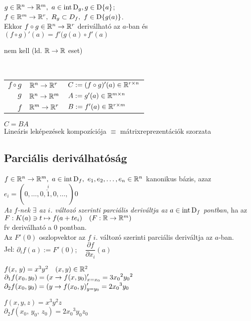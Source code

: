 \begin{te}
  $g\in\mathbb{R}^n\to\mathbb{R}^m,\ a\in\operatorname{int\,D}_g, g\in\operatorname{D}\{a\}$;\\ $f\in\mathbb{R}^m\to\mathbb{R}^r,\ R_g\subset D_f,\ f\in \operatorname{D}\{g(a)\}$.\\
  Ekkor $f\circ g\in\mathbb{R}^n\to\mathbb{R}^r$ deriválható az $a$-ban és $(f\circ g)'(a) = f'(g(a) \circ f'(a)$
\end{te}
\begin{biz} nem kell (ld. $\mathbb{R}\to\mathbb{R}$ eset)
\end{biz}

\begin{megj}\ \\
  \begin{tabular}{r@{$\,\in\,$}l@{$\ \nn\ $}l}
    $f\circ g$ & $\mathbb{R}^n\to\mathbb{R}^r$ &  $C:=(f\circ g)'(a)\in\mathbb{R}^{r\times n}$\\
    $g$ & $\mathbb{R}^n\to\mathbb{R}^m$ &  $A:=g'(a)\in\mathbb{R}^{m\times n}$\\
    $f$ & $\mathbb{R}^m\to\mathbb{R}^r$ &  $B:=f'(a)\in\mathbb{R}^{r\times m}$\\
  \end{tabular}$ C = BA$\\
Lineáris leképezések kompozíciója $\equiv$ mátrixreprezentációk szorzata
\end{megj}


\subsection{Parciális deriválhatóság}

\begin{de}
  $f\in\RnRm,\ a\in\intD_f,\ e_1,e_2,\dotsc,e_n\in\R^n$ kanonikus bázis, azaz $e_i = (0,\dotsc,0,
  \overset{i}{\breve{1}}, 0,\dotsc,)0 $\\
  \emph{Az $f$-nek $\exists$ az $i$. változó szerinti parciális deriváltja az $a\in\operatorname{int\,D}_f$ pontban}, ha az\\
  $F: K(a)\owns t \mapsto f(a+t e_i)\quad (F: \mathbb{R}\to\mathbb{R}^m)$\\
  fv deriválható a $0$ pontban.\\
  Az $F'(0)$ oszlopvektor az $f$ $i$. változó szerinti parciális deriváltja az $a$-ban.\\
  Jel: $\partial_i f(a) := F'(0);\quad \dfrac {\partial f}{\partial {x_i}}(a)$ 
\end{de}

\begin{Pl}
  \item $f(x,\,y) = x^3 y^2\quad (x,y)\in\mathbb{R}^2$\\
    $\displaystyle\partial_1 f(x_0,y_0) = (x\to f(x,y_0)'_{x=x_0} = 3{x_0}^2{y_0}^2$\\
    $\displaystyle\partial_2 f(x_0,y_0) = (y\to f(x_0,y)'_{y=y_0} = 2{x_0}^3y_0$
  \item $f(x,y,z) = x^3 y^2 z$\\
    $\partial_2 f(x_0,\,y_0,\,z_0)= 2{x_0}^3y_0z_0$
\end{Pl}


